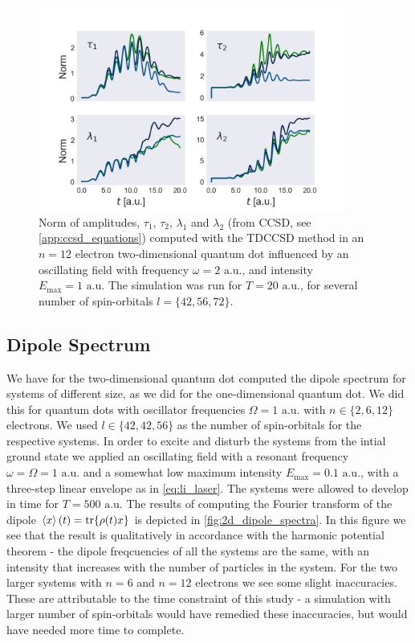 \begin{figure}
    \centering
    \includegraphics[width=0.9\textwidth]{results/figures/2D/n=12_amplitudes.png}
    \caption{Norm of amplitudes, $\tau_1$, $\tau_2$, $\lambda_1$ and
        $\lambda_2$ (from CCSD, see \autoref{app:ccsd_equations})
        computed with the TDCCSD method in an $n=12$ electron
        two-dimensional quantum 
        dot influenced by an oscillating field with frequency $\omega = 2 \text{ a.u.}$,
        and intensity $E_\text{max} = 1 \text{ a.u.}$ The simulation was run for 
        $T = 20 \text{ a.u.}$, for several number of 
        spin-orbitals $l=\{42,56,72\}$. 
    }
    \label{fig:n12_2d_amp_norms}
\end{figure}

\subsection{Dipole Spectrum}

We have for the two-dimensional quantum dot computed the dipole spectrum for systems of 
different size, as we did for the one-dimensional quantum dot. We did this for 
quantum dots with oscillator frequencies $\Omega=1 \text{ a.u.}$ with $n\in\{2,6,12\}$ electrons.
We used $l\in\{42,42,56\}$ as the number of spin-orbitals for the respective systems.
In order to excite and disturb the systems from the intial ground state we applied 
an oscillating field with a resonant frequency $\omega=\Omega=1 \text{ a.u.}$ and a somewhat low 
maximum intensity $E_\text{max}=0.1 \text{ a.u.}$, with a three-step linear envelope as 
in \autoref{eq:li_laser}. The systems were allowed to develop in time for 
$T = 500 \text{ a.u.}$ The results of computing the Fourier transform of the 
dipole $\ev{x}(t) = \tr{\rho(t) x}$ is depicted in \autoref{fig:2d_dipole_spectra}. 
In this figure we see that the result is qualitatively in accordance with the 
harmonic potential theorem - the dipole freqcuencies of all the systems are the 
same, with an intensity that increases with the number of particles in the system.
For the two larger systems with $n=6$ and $n=12$ electrons we see some slight 
inaccuracies. These are attributable to the time constraint of this study - 
a simulation with larger number of spin-orbitals would have remedied these 
inaccuracies, but would have needed more time to complete.

